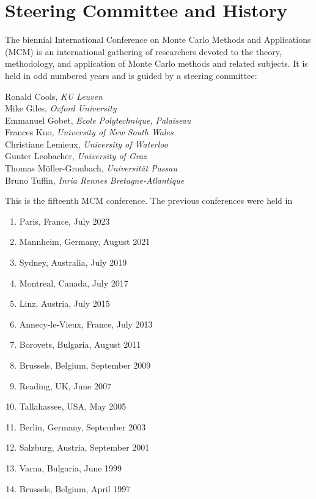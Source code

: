 

\section{Steering Committee and History}


The biennial International Conference on Monte Carlo Methods and Applications (MCM) is an international gathering of researchers devoted to the theory, methodology, and application of Monte Carlo methods and related subjects. It is held in odd numbered years and is guided by a steering committee: 

Ronald Cools, \emph{KU Leuven} \\
Mike Giles, \emph{Oxford University} \\
Emmanuel Gobet, \emph{Ecole Polytechnique, Palaiseau} \\
Frances Kuo, \emph{University of New South Wales} \\
Christiane Lemieux, \emph{University of Waterloo} \\
Gunter Leobacher, \emph{University of Graz} \\
Thomas Müller-Gronbach, \emph{Universität Passau} \\
Bruno Tuffin, \emph{Inria Rennes Bretagne-Atlantique}

This is the fifteenth MCM conference.  The previous  conferences were held in
\begin{enumerate}
\item Paris, France, July 2023
\item Mannheim, Germany, August 2021
\item Sydney, Australia, July 2019
\item Montreal, Canada, July 2017
\item Linz, Austria, July 2015
\item Annecy-le-Vieux, France, July 2013
\item Borovets, Bulgaria, August 2011
\item Brussels, Belgium, September 2009
\item Reading, UK, June 2007
\item Tallahassee, USA, May 2005
\item Berlin, Germany, September 2003
\item Salzburg, Austria, September 2001
\item Varna, Bulgaria, June 1999
\item Brussels, Belgium, April 1997 
\end{enumerate}


